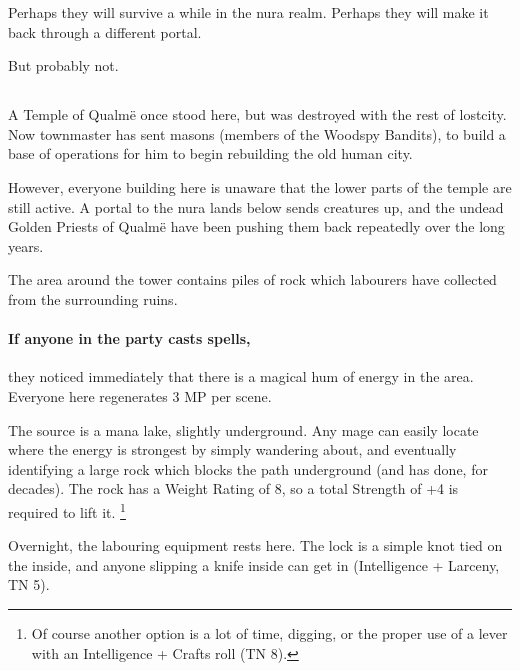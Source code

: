 \begin{multicols}{2}
Perhaps they will survive a while in the nura realm.
Perhaps they will make it back through a different portal.

But probably not.

\subsection{}
\label{green_tower}
\setcounter{list}{0}


A Temple of Qualm\"{e} once stood here, but was destroyed with the rest of \gls{lostcity}.
Now \gls{townmaster} has sent masons (members of the Woodspy Bandits), to build a base of operations for him to begin rebuilding the old human city.

However, everyone building here is unaware that the lower parts of the temple are still active.
A portal to the nura lands below sends creatures up, and the undead Golden Priests of Qualm\"{e} have been pushing them back repeatedly over the long years.


The area around the tower contains piles of rock which labourers have collected from the surrounding ruins.

\paragraph{If anyone in the party casts spells,}
they noticed immediately that there is a magical hum of energy in the area.
Everyone here regenerates 3 MP per scene.

The source is a mana lake, slightly underground.
Any mage can easily locate where the energy is strongest by simply wandering about, and eventually identifying a large rock which blocks the path underground (and has done, for decades).
The rock has a Weight Rating of 8, so a total Strength of +4 is required to lift it.%
\footnote{Of course another option is a lot of time, digging, or the proper use of a lever with an Intelligence + Crafts roll (TN 8).}



Overnight, the labouring equipment rests here.
The lock is a simple knot tied on the inside, and anyone slipping a knife inside can get in (Intelligence + Larceny, TN 5).



\end{multicols}
